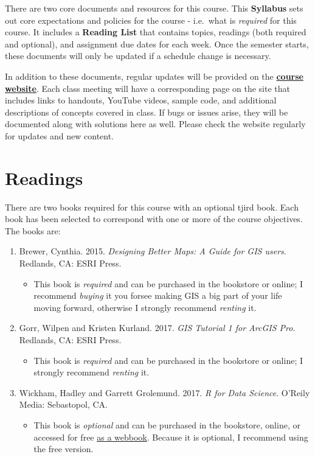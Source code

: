 \documentclass[
]{book}
\providecommand{\tightlist}{%
  \setlength{\itemsep}{0pt}\setlength{\parskip}{0pt}}
\begin{document}
There are two core documents and resources for this course. This \textbf{Syllabus} sets out core expectations and policies for the course - i.e.~what is \emph{required} for this course. It includes a \textbf{Reading List} that contains topics, readings (both required and optional), and assignment due dates for each week. Once the semester starts, these documents will only be updated if a schedule change is necessary.

In addition to these documents, regular updates will be provided on the \href{https://slu-soc5650.github.io}{\textbf{course website}}. Each class meeting will have a corresponding page on the site that includes links to handouts, YouTube videos, sample code, and additional descriptions of concepts covered in class. If bugs or issues arise, they will be documented along with solutions here as well. Please check the website regularly for updates and new content.

\hypertarget{readings}{%
\section{Readings}\label{readings}}

There are two books required for this course with an optional tjird book. Each book has been selected to correspond with one or more of the course objectives. The books are:

\begin{enumerate}
\def\labelenumi{\arabic{enumi}.}
\tightlist
\item
  Brewer, Cynthia. 2015. \emph{Designing Better Maps: A Guide for GIS users}. Redlands, CA: ESRI Press.

  \begin{itemize}
  \tightlist
  \item
    This book is \emph{required} and can be purchased in the bookstore or online; I recommend \emph{buying} it you forsee making GIS a big part of your life moving forward, otherwise I strongly recommend \emph{renting} it.
  \end{itemize}
\item
  Gorr, Wilpen and Kristen Kurland. 2017. \emph{GIS Tutorial 1 for ArcGIS Pro}. Redlands, CA: ESRI Press.

  \begin{itemize}
  \tightlist
  \item
    This book is \emph{required} and can be purchased in the bookstore or online; I strongly recommend \emph{renting} it.
  \end{itemize}
\item
  Wickham, Hadley and Garrett Grolemund. 2017. \emph{R for Data Science}. O'Reily Media: Sebastopol, CA.

  \begin{itemize}
  \tightlist
  \item
    This book is \emph{optional} and can be purchased in the bookstore, online, or accessed for free \href{http://r4ds.had.co.nz}{as a webbook}. Because it is optional, I recommend using the free version.
  \end{itemize}
\end{enumerate}
\end{document}
